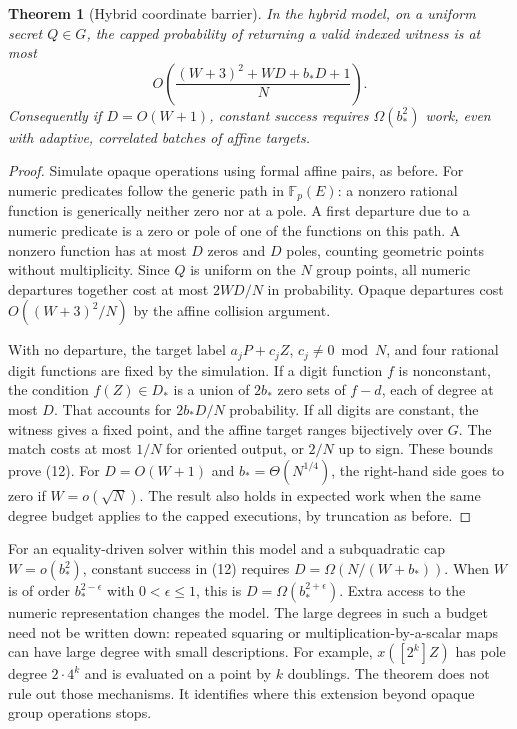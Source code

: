 \documentclass[11pt]{article}
\newtheorem{theorem}{Theorem}
\newcommand{\Fp}{\mathbb F_p}
\begin{document}
\begin{theorem}[Hybrid coordinate barrier]
In the hybrid model, on a uniform secret \(Q\in G\), the capped probability of returning a valid indexed witness is at most
\[
 O\!\left(\frac{(W+3)^2+WD+b_*D+1}{N}\right).
\tag{12}
\]
Consequently if \(D=O(W+1)\), constant success requires \(\Omega(b_*^2)\) work, even with adaptive, correlated batches of affine targets.
\end{theorem}
\begin{proof}
Simulate opaque operations using formal affine pairs, as before. For numeric predicates follow the generic path in \(\Fp(E)\): a nonzero rational function is generically neither zero nor at a pole. A first departure due to a numeric predicate is a zero or pole of one of the functions on this path. A nonzero function has at most \(D\) zeros and \(D\) poles, counting geometric points without multiplicity. Since \(Q\) is uniform on the \(N\) group points, all numeric departures together cost at most \(2WD/N\) in probability. Opaque departures cost \(O((W+3)^2/N)\) by the affine collision argument.

With no departure, the target label \(a_jP+c_jZ\), \(c_j\ne0\bmod N\), and four rational digit functions are fixed by the simulation. If a digit function \(f\) is nonconstant, the condition \(f(Z)\in D_*\) is a union of \(2b_*\) zero sets of \(f-d\), each of degree at most \(D\). That accounts for \(2b_*D/N\) probability. If all digits are constant, the witness gives a fixed point, and the affine target ranges bijectively over \(G\). The match costs at most \(1/N\) for oriented output, or \(2/N\) up to sign. These bounds prove (12). For \(D=O(W+1)\) and \(b_*=\Theta(N^{1/4})\), the right-hand side goes to zero if \(W=o(\sqrt N)\). The result also holds in expected work when the same degree budget applies to the capped executions, by truncation as before.
\end{proof}

For an equality-driven solver within this model and a subquadratic cap \(W=o(b_*^2)\), constant success in (12) requires \(D=\Omega(N/(W+b_*))\). When \(W\) is of order \(b_*^{2-\epsilon}\) with \(0<\epsilon\le1\), this is \(D=\Omega(b_*^{2+\epsilon})\). Extra access to the numeric representation changes the model. The large degrees in such a budget need not be written down: repeated squaring or multiplication-by-a-scalar maps can have large degree with small descriptions. For example, \(x([2^k]Z)\) has pole degree \(2\cdot4^k\) and is evaluated on a point by \(k\) doublings. The theorem does not rule out those mechanisms. It identifies where this extension beyond opaque group operations stops.
\end{document}
